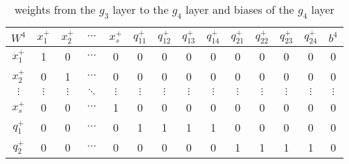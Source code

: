 \begin{table}[p]
	\centering
	\begin{tabular}{|c| c c c c c c c c c c c c |c|}
		\hline 
		$W^4$ & $x_1^+$ & $x_2^+$ & $\cdots$ & $x_s^+$ & $q_{11}^+$ & $q_{12}^+$ & $q_{13}^+$ & $q_{14}^+$ & $q_{21}^+$ & $q_{22}^+$ & $q_{23}^+$ & $q_{24}^+$ & $b^4$ \\
		\hline
		$x_1^+$ & 1 & 0 & $\cdots$ & 0 & 0 & 0 & 0 & 0 & 0 & 0 & 0 & 0 & 0 \\
		$x_2^+$ & 0 & 1 & $\cdots$ & 0 & 0 & 0 & 0 & 0 & 0 & 0 & 0 & 0 & 0 \\
		$\vdots$ & $\vdots$ & $\vdots$ & $\ddots$ & $\vdots$ & $\vdots$ & $\vdots$ & $\vdots$ & $\vdots$ & $\vdots$ & $\vdots$ & $\vdots$ & $\vdots$ & $\vdots$ \\
		$x_s^+$ & 0 & 0 & $\cdots$ & 1 & 0 & 0 & 0 & 0 & 0 & 0 & 0 & 0 & 0 \\
		$q_1^+$ & 0 & 0 & $\cdots$ & 0 & 1 & 1 & 1 & 1 & 0 & 0 & 0 & 0 & 0 \\
		$q_2^+$ & 0 & 0 & $\cdots$ & 0 & 0 & 0 & 0 & 0 & 1 & 1 & 1 & 1 & 0 \\
		\hline
	\end{tabular}
	\caption{weights from the $g_3$ layer to the $g_4$ layer and biases of the $g_4$ layer}
	\label{tab:W4b4}
\end{table}